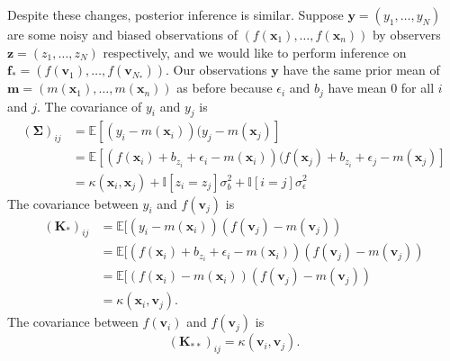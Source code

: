 Despite these changes, posterior inference is similar.
Suppose $\mathbf{y} = (y_1, \dots, y_N)$ are some noisy and biased observations of $(f(\mathbf{x}_1), \dots, f(\mathbf{x}_n))$ by observers $\mathbf{z} = (z_1, \ldots, z_N)$ respectively, and we would like to perform inference on $\mathbf{f}_* = (f(\mathbf{v}_1), \dots, f(\mathbf{v}_{N_{*}}))$.
Our observations $\mathbf{y}$ have the same prior mean of $\mathbf{m} = (m(\mathbf{x}_1), \dots, m(\mathbf{x}_n))$ as before because $\epsilon_i$ and $b_j$ have mean 0 for all $i$ and $j$.
The covariance of $y_i$ and $y_{j}$ is
\begin{align*}
    (\mathbf{\Sigma})_{ij}
    & = \mathbb{E}[(y_i - m(\mathbf{x}_i))(y_j - m(\mathbf{x}_j)] \\
    & = \mathbb{E}[(f(\mathbf{x}_i) + b_{z_i} + \epsilon_i - m(\mathbf{x}_i))(f(\mathbf{x}_j) + b_{z_i} + \epsilon_j - m(\mathbf{x}_j)] \\
    & = \kappa(\mathbf{x}_i, \mathbf{x}_{j}) + \mathbb{I}[z_i = z_{j}] \sigma^2_b + \mathbb{I}[i = j]\sigma^2_{ \epsilon }
\end{align*}
The covariance between $y_i$ and $f(\mathbf{v}_j)$ is
\begin{align*}
    (\mathbf{K}_{*})_{ij}
    & = \mathbb{E}[ (y_i - m(\mathbf{x}_i))(f(\mathbf{v}_j) - m(\mathbf{v}_j)) \\
    & = \mathbb{E}[ (f(\mathbf{x}_i) + b_{z_i} + \epsilon_i - m(\mathbf{x}_i))(f(\mathbf{v}_j) - m(\mathbf{v}_j)) \\
    & = \mathbb{E}[ (f(\mathbf{x}_i) - m(\mathbf{x}_i))(f(\mathbf{v}_j) - m(\mathbf{v}_j)) \\
    & = \kappa(\mathbf{x}_i, \mathbf{v}_j).
\end{align*}
The covariance between $f(\mathbf{v}_i)$ and $f(\mathbf{v}_j)$ is
\begin{equation*}
    (\mathbf{K}_{* *})_{ij} = \kappa(\mathbf{v}_i, \mathbf{v}_j).
\end{equation*}
